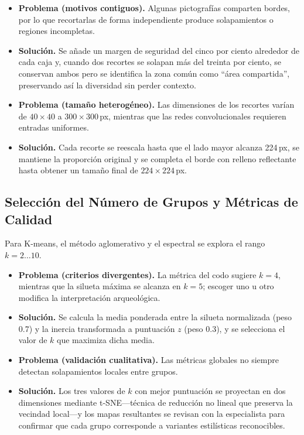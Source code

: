 \begin{itemize}
  \item \textbf{Problema (motivos contiguos).}
        Algunas pictografías comparten bordes, por lo que recortarlas de forma independiente produce solapamientos o regiones incompletas.
  \item \textbf{Solución.}
        Se añade un margen de seguridad del cinco por ciento alrededor de cada caja y, cuando dos recortes se solapan más del treinta por ciento, se conservan ambos pero se identifica la zona común como ``área compartida'', preservando así la diversidad sin perder contexto.

  \item \textbf{Problema (tamaño heterogéneo).}
        Las dimensiones de los recortes varían de \(40\times40\) a \(300\times300\)\,px, mientras que las redes convolucionales requieren entradas uniformes.
  \item \textbf{Solución.}
        Cada recorte se reescala hasta que el lado mayor alcanza 224\,px, se mantiene la proporción original y se completa el borde con relleno reflectante hasta obtener un tamaño final de \(224\times224\)\,px.
\end{itemize}

\subsection{Selección del Número de Grupos y Métricas de Calidad}\label{ssec:k_selection}

Para K-means, el método aglomerativo y el espectral se explora el rango \(k=2\dots10\).

\begin{itemize}
  \item \textbf{Problema (criterios divergentes).}
        La métrica del codo sugiere \(k=4\), mientras que la silueta máxima se alcanza en \(k=5\); escoger uno u otro modifica la interpretación arqueológica.
  \item \textbf{Solución.}
        Se calcula la media ponderada entre la silueta normalizada (peso 0.7) y la inercia transformada a puntuación \(z\) (peso 0.3), y se selecciona el valor de \(k\) que maximiza dicha media.

  \item \textbf{Problema (validación cualitativa).}
        Las métricas globales no siempre detectan solapamientos locales entre grupos.
  \item \textbf{Solución.}
        Los tres valores de \(k\) con mejor puntuación se proyectan en dos dimensiones mediante t-SNE—técnica de reducción no lineal que preserva la vecindad local—y los mapas resultantes se revisan con la especialista para confirmar que cada grupo corresponde a variantes estilísticas reconocibles.
\end{itemize}

